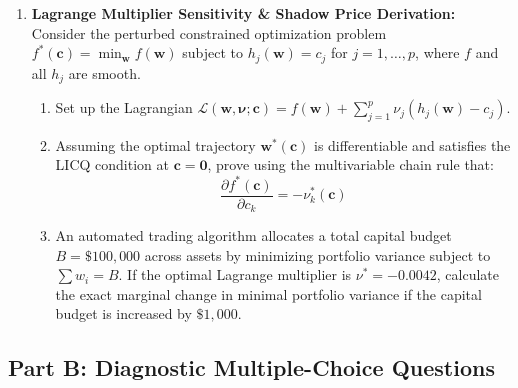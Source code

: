 \begin{enumerate}[label=\textbf{P\arabic*.}]
    \item \textbf{Lagrange Multiplier Sensitivity \& Shadow Price Derivation:}
    Consider the perturbed constrained optimization problem $f^*(\mathbf{c}) = \min_{\mathbf{w}} f(\mathbf{w})$ subject to $h_j(\mathbf{w}) = c_j$ for $j = 1, \dots, p$, where $f$ and all $h_j$ are smooth.
    \begin{enumerate}[label=(\alph*)]
        \item Set up the Lagrangian $\mathcal{L}(\mathbf{w}, \boldsymbol{\nu}; \mathbf{c}) = f(\mathbf{w}) + \sum_{j=1}^p \nu_j (h_j(\mathbf{w}) - c_j)$.
        \item Assuming the optimal trajectory $\mathbf{w}^*(\mathbf{c})$ is differentiable and satisfies the LICQ condition at $\mathbf{c} = \mathbf{0}$, prove using the multivariable chain rule that:
        \begin{equation*}
        \frac{\partial f^*(\mathbf{c})}{\partial c_k} = -\nu_k^*(\mathbf{c})
        \end{equation*}
        \item An automated trading algorithm allocates a total capital budget $B = \$100{,}000$ across assets by minimizing portfolio variance subject to $\sum w_i = B$. If the optimal Lagrange multiplier is $\nu^* = -0.0042$, calculate the exact marginal change in minimal portfolio variance if the capital budget is increased by $\$1{,}000$.
    \end{enumerate}
\end{enumerate}

\subsection*{Part B: Diagnostic Multiple-Choice Questions}

